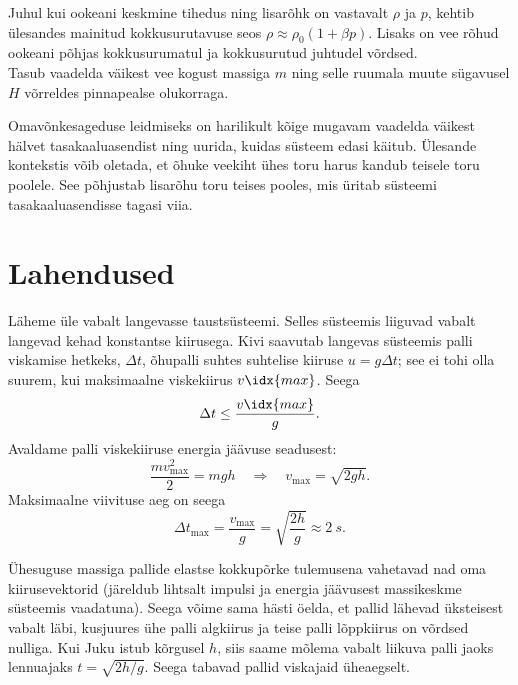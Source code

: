 \documentclass[10pt, twoside]{article}
\begin{document}
{
\hint
\osa Juhul kui ookeani keskmine tihedus ning lisarõhk on vastavalt $\rho$ ja $p$, kehtib ülesandes mainitud kokkusurutavuse seos $\rho \approx \rho_0 ( 1 + \beta p)$. Lisaks on vee rõhud ookeani põhjas kokkusurumatul ja kokkusurutud juhtudel võrdsed.\\
\osa Tasub vaadelda väikest vee kogust massiga $m$ ning selle ruumala muute sügavusel $H$ võrreldes pinnapealse olukorraga.
\probend
\bigskip


\hint
Omavõnkesageduse leidmiseks on harilikult kõige mugavam vaadelda väikest hälvet tasakaaluasendist ning uurida, kuidas süsteem edasi käitub. Ülesande kontekstis võib oletada, et õhuke veekiht ühes toru harus kandub teisele toru poolele. See põhjustab lisarõhu toru teises pooles, mis üritab süsteemi tasakaaluasendisse tagasi viia.
\probend
\bigskip
\newpage\section{Lahendused}
        \toggleSolution
        

\solu
Läheme üle vabalt langevasse taustsüsteemi. Selles süsteemis liiguvad vabalt langevad kehad konstantse kiirusega. Kivi saavutab langevas süsteemis palli viskamise hetkeks, $\Delta t$, õhupalli suhtes suhtelise kiiruse $u = g\Delta t$; see ei tohi olla suurem, kui maksimaalne viskekiirus $v\idx{max}$. Seega
\[
\Delta t \leq \frac{v\idx{max}}{g}.
\]
Avaldame palli viskekiiruse energia jäävuse seadusest:
\[
\frac{m v_{\max }^{2}}{2}=m g h \quad \Rightarrow \quad v_{\max }=\sqrt{2 g h}.
\]
Maksimaalne viivituse aeg on seega
\[
\Delta t_{\max }=\frac{v_{\max }}{g}=\sqrt{\frac{2 h}{g}} \approx \SI{2}{s}.
\]
\probend
\bigskip


\solu
Ühesuguse massiga pallide elastse kokkupõrke tulemusena vahetavad nad oma
kiirusevektorid (järeldub lihtsalt impulsi ja energia jäävusest massikeskme süsteemis vaadatuna). Seega võime sama hästi öelda, et pallid lähevad üksteisest vabalt läbi, kusjuures ühe palli algkiirus ja teise palli lõppkiirus on võrdsed nulliga. Kui Juku istub kõrgusel $h$, siis saame mõlema vabalt liikuva palli jaoks lennuajaks $t = \sqrt{2h/g}$. Seega tabavad pallid viskajaid üheaegselt. 

}
\end{document}
